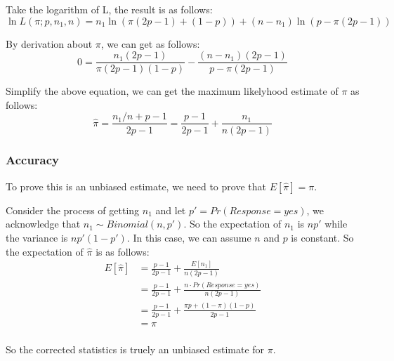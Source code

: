 \documentclass[a4paper,12pt]{article}
\begin{document}
Take the logarithm of L, the result is as follows:
\begin{equation}
    \ln{L(\pi; p, n_1, n)} = n_1\ln{(\pi(2p - 1) + (1 - p))} + (n - n_1)\ln{(p - \pi(2p - 1))}
\end{equation}

By derivation about $\pi$, we can get as follows:
\begin{equation}
    0 = \frac{n_1(2p - 1)}{\pi(2p - 1)(1 - p)} - \frac{(n - n_1)(2p - 1)}{p - \pi(2p - 1)}
\end{equation}

Simplify the above equation, we can get the maximum likelyhood estimate of $\pi$ as follows:
\begin{equation}
    \hat{\pi} = \frac{n_1/n + p - 1}{2p - 1} = \frac{p - 1}{2p - 1} + \frac{n_1}{n(2p - 1)}
\end{equation}

\subsubsection{Accuracy}
To prove this is an unbiased estimate, we need to prove that $E[\hat{\pi}] = \pi$.

Consider the process of getting $n_1$ and let $p' =  Pr(Response = yes)$, we acknowledge that $n_1 \sim Binomial(n, p')$. So the expectation of $n_1$ is $np'$ while the variance is $np'(1 - p')$. In this case, we can assume $n$ and $p$ is constant. So the expectation of $\hat{\pi}$ is as follows:
\begin{equation}
    \begin{aligned}
        E[\hat{\pi}] & = \frac{p - 1}{2p - 1} + \frac{E[n_1]}{n(2p - 1)}                    \\
                     & = \frac{p - 1}{2p - 1} + \frac{n\cdot Pr(Response = yes)}{n(2p - 1)} \\
                     & = \frac{p - 1}{2p - 1} + \frac{\pi p + (1 - \pi)(1 - p)}{2p - 1}     \\
                     & = \pi                                                                \\
    \end{aligned}
\end{equation}

So the corrected statistics is truely an unbiased estimate for $\pi$.
\end{document}

